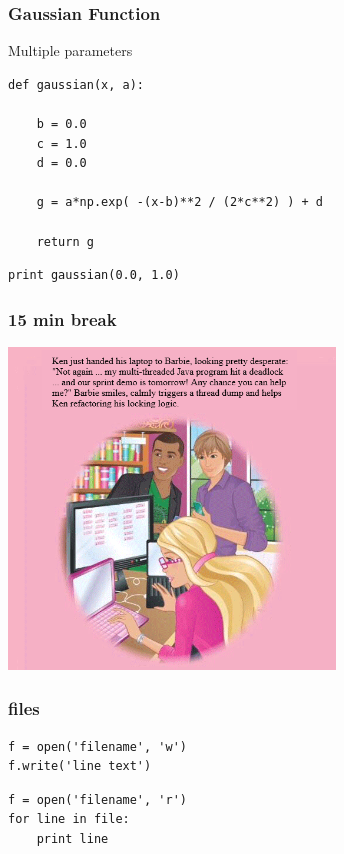 \begin{frame}[fragile]

    \frametitle{Gaussian Function}

    Multiple parameters

    \bigskip

\begin{lstlisting}
def gaussian(x, a):

    b = 0.0
    c = 1.0
    d = 0.0

    g = a*np.exp( -(x-b)**2 / (2*c**2) ) + d

    return g
\end{lstlisting}

\begin{lstlisting}
print gaussian(0.0, 1.0)
\end{lstlisting}

\end{frame}

\begin{frame}[fragile]
    \frametitle{15 min break}
    \begin{center}
        \includegraphics[width=0.65\textwidth]{images/barbie2.png}
    \end{center}
\end{frame}


\begin{frame}[fragile]

    \frametitle{files}

\begin{lstlisting}
f = open('filename', 'w')
f.write('line text')
\end{lstlisting}

\begin{lstlisting}
f = open('filename', 'r')
for line in file:
    print line
\end{lstlisting}

\end{frame}


